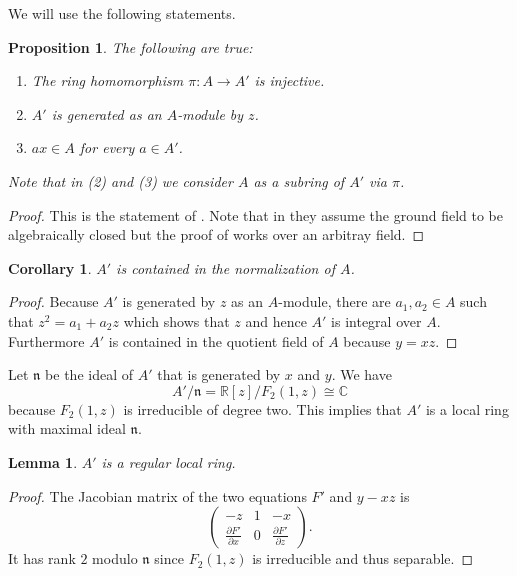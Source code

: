 \documentclass[a4paper,10pt]{amsart}
\theoremstyle{definition}
\theoremstyle{plain}
\newtheorem{prop}[Def]{Proposition}
\newtheorem{lem}[Def]{Lemma}
\newtheorem{cor}[Def]{Corollary}
\newcommand{\fn}{{\mathfrak n}}
\newcommand{\C}{{\mathbb C}}
\newcommand{\R}{{\mathbb R}}
\begin{document}
We will use the following statements.

\begin{prop}\label{prop:blowup}
The following are true:
\begin{enumerate}
    \item The ring homomorphism $ \pi\colon A\to A'$ is injective.
    \item $A'$ is generated as an $A$-module by $z$.
    \item $ax\in A$ for every $a\in A'$.
\end{enumerate}
Note that in (2) and (3) we consider $A$ as a subring of $A'$ via $\pi$.
\end{prop}

\begin{proof}
 This is the statement of \cite[Proposition~1]{fultonblowup}. Note that in \cite{fultonblowup} they assume the ground field to be algebraically closed but the proof of \cite[Proposition~1]{fultonblowup} works over an arbitray field.
\end{proof}

\begin{cor}\label{cor:AinN}
$A'$ is contained in the normalization of $A$.
\end{cor}

\begin{proof}
 Because $A'$ is generated by $z$ as an $A$-module, there are $a_1,a_2\in A$ such that $z^2=a_1+a_2z$ which shows that $z$ and hence $A'$ is integral over $A$. Furthermore $A'$ is contained in the quotient field of $A$ because $y=xz$.
\end{proof}

Let $\fn$ be the ideal of $A'$ that is generated by $x$ and $y$. We have
\begin{equation*}
    A'/\fn=\R[z]/F_2(1,z)\cong\C
\end{equation*}
because $F_2(1,z)$ is irreducible of degree two. This implies that $A'$ is a local ring with maximal ideal $\fn$.

\begin{lem}\label{lem:Areg}
 $A'$ is a regular local ring.
\end{lem}

\begin{proof}
 The Jacobian matrix of the two equations $F'$ and $y-xz$ is
 \begin{equation*}
     \begin{pmatrix}
      -z& 1& -x\\
      \frac{\partial F'}{\partial x}& 0 & \frac{\partial F'}{\partial z}
     \end{pmatrix}.
 \end{equation*}
 It has rank $2$ modulo $\fn$ since $F_2(1,z)$ is irreducible and thus separable.
\end{proof}
\end{document}
